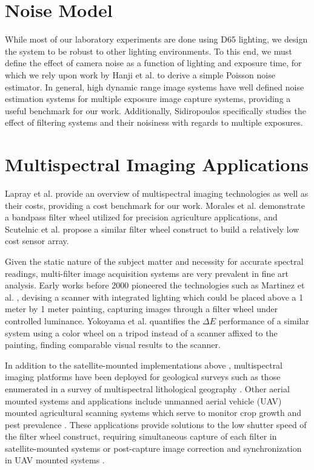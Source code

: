 \section{Noise Model}
While most of our laboratory experiments are done using D65 lighting, we design the system to be robust to other lighting environments.
To this end, we must define the effect of camera noise as a function of lighting and exposure time, for which we rely upon work by Hanji et al. \cite{hanji2020noise} to derive a simple Poisson noise estimator.
In general, high dynamic range image systems \cite{akyuz2007noise, mann1994beingundigital, sidiropoulos1994optimal} have well defined noise estimation systems for multiple exposure image capture systems, providing a useful benchmark for our work. 
Additionally, Sidiropoulos \cite{sidiropoulos1994optimal} specifically studies the effect of filtering systems and their noisiness with regards to multiple exposures. 

\section{Multispectral Imaging Applications}
Lapray et al. \cite{lapray2014multispectral} provide an overview of multispectral imaging technologies as well as their costs, providing a cost benchmark for our work. 
Morales et al. \cite{morales2020multispectral} demonstrate a bandpass filter wheel utilized for precision agriculture applications, and Scutelnic et al. \cite{SCUTELNIC2024e00596} propose a similar filter wheel construct to build a relatively low cost sensor array. 

Given the static nature of the subject matter and necessity for accurate spectral readings, multi-filter image acquisition systems are very prevalent in fine art analysis. 
Early works before 2000 pioneered the technologies such as Martinez et al. \cite{martinez1993high}, devising a scanner with integrated lighting which could be placed above a 1 meter by 1 meter painting, capturing images through a filter wheel under controlled luminance. 
Yokoyama et al. \cite{yokoyama1997new} quantifies the $\Delta E$ performance of a similar system using a color wheel on a tripod instead of a scanner affixed to the painting, finding comparable visual results to the scanner. 

In addition to the satellite-mounted implementations above \cite{mannheimer1977landsat, USGSLandsat1}, multispectral imaging platforms have been deployed for geological surveys such as those enumerated in a survey of multispectral lithological geography \cite{peyghambari2021lithological}.
Other aerial mounted systems and applications include unmanned aerial vehicle (UAV) mounted agricultural scanning systems which serve to monitor crop growth and pest prevalence \cite{SCUTELNIC2024e00596, lu2020agriculture}.
These applications provide solutions to the low shutter speed of the filter wheel construct, requiring simultaneous capture of each filter in satellite-mounted systems \cite{eoPortalHISUI} or post-capture image correction and synchronization in UAV mounted systems \cite{Hunt18082018}. 

